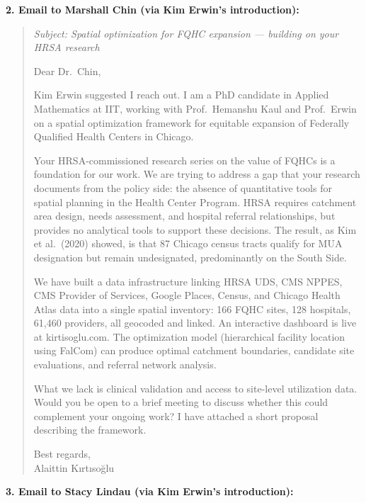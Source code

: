 \documentclass[11pt]{article}
\begin{document}
\bigskip

\textbf{2. Email to Marshall Chin (via Kim Erwin's introduction):}

\begin{quote}
\textit{Subject: Spatial optimization for FQHC expansion --- building on your HRSA research}

Dear Dr.\ Chin,

Kim Erwin suggested I reach out. I am a PhD candidate in Applied Mathematics at IIT, working with Prof.\ Hemanshu Kaul and Prof.\ Erwin on a spatial optimization framework for equitable expansion of Federally Qualified Health Centers in Chicago.

Your HRSA-commissioned research series on the value of FQHCs is a foundation for our work. We are trying to address a gap that your research documents from the policy side: the absence of quantitative tools for spatial planning in the Health Center Program. HRSA requires catchment area design, needs assessment, and hospital referral relationships, but provides no analytical tools to support these decisions. The result, as Kim et al.\ (2020) showed, is that 87 Chicago census tracts qualify for MUA designation but remain undesignated, predominantly on the South Side.

We have built a data infrastructure linking HRSA UDS, CMS NPPES, CMS Provider of Services, Google Places, Census, and Chicago Health Atlas data into a single spatial inventory: 166 FQHC sites, 128 hospitals, 61,460 providers, all geocoded and linked. An interactive dashboard is live at kirtisoglu.com. The optimization model (hierarchical facility location using FalCom) can produce optimal catchment boundaries, candidate site evaluations, and referral network analysis.

What we lack is clinical validation and access to site-level utilization data. Would you be open to a brief meeting to discuss whether this could complement your ongoing work? I have attached a short proposal describing the framework.

Best regards,\\
Alaittin K{\i}rt{\i}so\u{g}lu
\end{quote}

\bigskip

\textbf{3. Email to Stacy Lindau (via Kim Erwin's introduction):}
\end{document}
